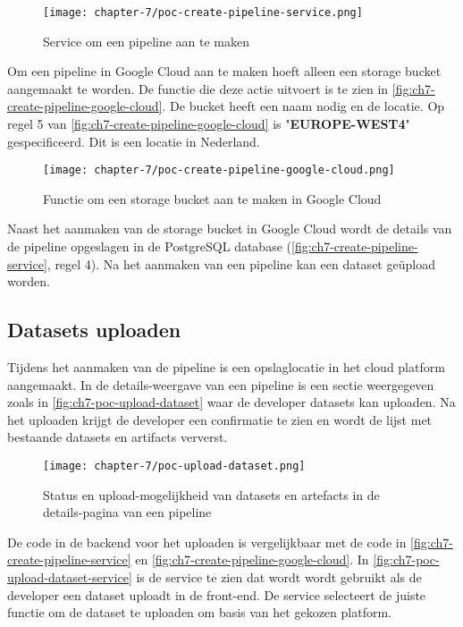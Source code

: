 \newpage

\begin{figure}[hbt!]
  \centering
  \texttt{[image: chapter-7/poc-create-pipeline-service.png]}
  \caption{Service om een pipeline aan te maken}
  \label{fig:ch7-create-pipeline-service}
\end{figure}

Om een pipeline in Google Cloud aan te maken hoeft alleen een storage bucket aangemaakt te worden. De functie die deze actie uitvoert is te zien in \autoref{fig:ch7-create-pipeline-google-cloud}. De bucket heeft een naam nodig en de locatie. Op regel 5 van \autoref{fig:ch7-create-pipeline-google-cloud} is \string"\textbf{EUROPE-WEST4}\string" gespecificeerd. Dit is een locatie in Nederland.

\begin{figure}[hbt!]
  \centering
  \texttt{[image: chapter-7/poc-create-pipeline-google-cloud.png]}
  \caption{Functie om een storage bucket aan te maken in Google Cloud}
  \label{fig:ch7-create-pipeline-google-cloud}
\end{figure}

Naast het aanmaken van de storage bucket in Google Cloud wordt de details van de pipeline opgeslagen in de PostgreSQL database (\autoref{fig:ch7-create-pipeline-service}, regel 4). Na het aanmaken van een pipeline kan een dataset geüpload worden.

\subsection{Datasets uploaden}\label{subsec:ch7-datasets-uploaden}
Tijdens het aanmaken van de pipeline is een opslaglocatie in het cloud platform aangemaakt. In de details-weergave van een pipeline is een sectie weergegeven zoals in \autoref{fig:ch7-poc-upload-dataset} waar de developer datasets kan uploaden. Na het uploaden krijgt de developer een confirmatie te zien en wordt de lijst met bestaande datasets en artifacts ververst.

\newpage

\begin{figure}[hbt!]
  \centering
  \texttt{[image: chapter-7/poc-upload-dataset.png]}
  \caption{Status en upload-mogelijkheid van datasets en artefacts in de details-pagina van een pipeline}
  \label{fig:ch7-poc-upload-dataset}
\end{figure}

De code in de backend voor het uploaden is vergelijkbaar met de code in \autoref{fig:ch7-create-pipeline-service} en \autoref{fig:ch7-create-pipeline-google-cloud}. In \autoref{fig:ch7-poc-upload-dataset-service} is de service te zien dat wordt wordt gebruikt als de developer een dataset uploadt in de front-end. De service selecteert de juiste functie om de dataset te uploaden om basis van het gekozen platform.

